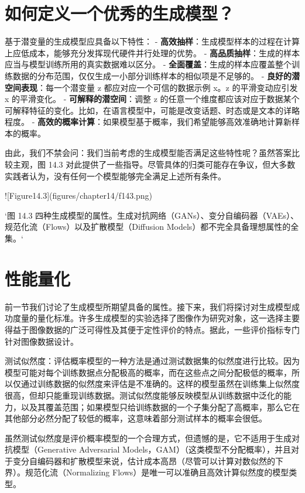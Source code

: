 \section{如何定义一个优秀的生成模型？}
基于潜变量的生成模型应具备以下特性：
- \textbf{高效抽样}：生成模型样本的过程在计算上应低成本，能够充分发挥现代硬件并行处理的优势。
- \textbf{高品质抽样}：生成的样本应当与模型训练所用的真实数据难以区分。
- \textbf{全面覆盖}：生成的样本应覆盖整个训练数据的分布范围，仅仅生成一小部分训练样本的相似项是不足够的。
- \textbf{良好的潜空间表现}：每一个潜变量 z 都应对应一个可信的数据示例 x。z 的平滑变动应引发 x 的平滑变化。
- \textbf{可解释的潜空间}：调整 z 的任意一个维度都应该对应于数据某个可解释特征的变化。比如，在语言模型中，可能是改变话题、时态或是文本的详略程度。
- \textbf{高效的概率计算}：如果模型基于概率，我们希望能够高效准确地计算新样本的概率。

由此，我们不禁会问：我们当前考虑的生成模型能否满足这些特性呢？虽然答案比较主观，图 14.3 对此提供了一些指导。尽管具体的归类可能存在争议，但大多数实践者认为，没有任何一个模型能够完全满足上述所有条件。

![Figure14.3](figures/chapter14/f143.png)

`图 14.3 四种生成模型的属性。生成对抗网络（GANs）、变分自编码器（VAEs）、规范化流（Flows）以及扩散模型（Diffusion Models）都不完全具备理想属性的全集。`
\section{性能量化}
前一节我们讨论了生成模型所期望具备的属性。接下来，我们将探讨对生成模型成功度量的量化标准。许多生成模型的实验选择了图像作为研究对象，这一选择主要得益于图像数据的广泛可得性及其便于定性评价的特点。据此，一些评价指标专门针对图像数据设计。

测试似然度：评估概率模型的一种方法是通过测试数据集的似然度进行比较。因为模型可能对每个训练数据点分配极高的概率，而在这些点之间分配极低的概率，所以仅通过训练数据的似然度来评估是不准确的。这样的模型虽然在训练集上似然度很高，但却只能重现训练数据。测试似然度能够反映模型从训练数据中泛化的能力，以及其覆盖范围；如果模型只给训练数据的一个子集分配了高概率，那么它在其他部分必然分配了较低的概率，这意味着部分测试样本的概率会很低。

虽然测试似然度是评价概率模型的一个合理方式，但遗憾的是，它不适用于生成对抗模型（Generative Adversarial Models，GAM）（这类模型不分配概率），并且对于变分自编码器和扩散模型来说，估计成本高昂（尽管可以计算对数似然的下界）。规范化流（Normalizing Flows）是唯一可以准确且高效计算似然度的模型类型。

